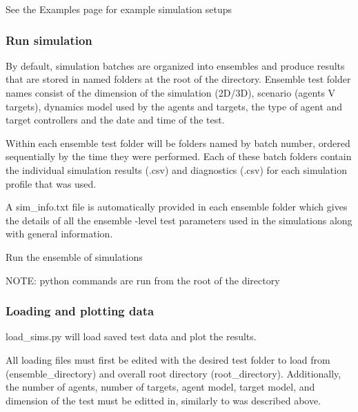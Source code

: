 See the Examples page for example simulation setups

\subsubsection*{Run simulation}

By default, simulation batches are organized into ensembles and produce results that are stored in named folders at the root of the directory. Ensemble test folder names consist of the dimension of the simulation (2D/3D), scenario (agents V targets), dynamics model used by the agents and targets, the type of agent and target controllers and the date and time of the test.

Within each ensemble test folder will be folders named by batch number, ordered sequentially by the time they were performed. Each of these batch folders contain the individual simulation results (.csv) and diagnostics (.csv) for each simulation profile that was used.

A sim\+\_\+info.\+txt file is automatically provided in each ensemble folder which gives the details of all the ensemble -\/level test parameters used in the simulations along with general information.

Run the ensemble of simulations 
\begin{DoxyCode}{0}
\end{DoxyCode}


N\+O\+TE\+: python commands are run from the root of the directory

\subsubsection*{Loading and plotting data}

load\+\_\+sims.\+py will load saved test data and plot the results.

All loading files must first be edited with the desired test folder to load from (ensemble\+\_\+directory) and overall root directory (root\+\_\+directory). Additionally, the number of agents, number of targets, agent model, target model, and dimension of the test must be editted in, similarly to was described above.

